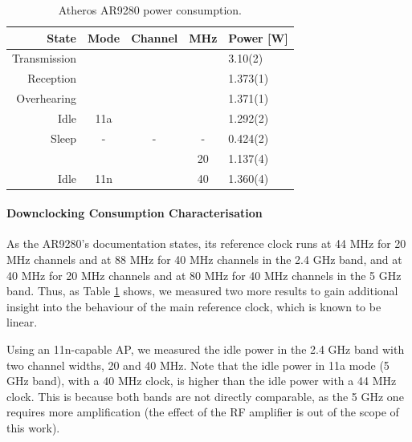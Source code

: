 \documentclass[twoside,nohyper]{tufte-book}
\theoremstyle{definition}
\theoremstyle{definition}
\theoremstyle{definition}
\theoremstyle{remark}
\begin{document}
\begin{table}

\begin{center}
\begin{tabular}{rcccl}
\toprule
State & Mode & Channel & MHz & Power [W]\\
\midrule
Transmission &  &  &  & 3.10(2)\\

Reception &  &  &  & 1.373(1)\\

Overhearing &  &  &  & 1.371(1)\\

Idle & \multirow{-4}{*}{\centering\arraybackslash 11a} & \multirow{-4}{*}{\centering\arraybackslash 44} & \multirow{-4}{*}{\centering\arraybackslash 20} & 1.292(2)\\
\cmidrule{1-5}
Sleep & - & - & - & 0.424(2)\\
\cmidrule{1-5}
 &  &  & 20 & 1.137(4)\\

\multirow{-2}{*}{\raggedleft\arraybackslash Idle} & \multirow{-2}{*}{\centering\arraybackslash 11n} & \multirow{-2}{*}{\centering\arraybackslash 11} & 40 & 1.360(4)\\
\bottomrule
\end{tabular}
\end{center}
\caption{\label{tab:powert}Atheros AR9280 power consumption.}
\end{table}

\hypertarget{downclocking-consumption-characterisation}{%
\paragraph{Downclocking Consumption
Characterisation}\label{downclocking-consumption-characterisation}}

As the AR9280's documentation states, its reference clock runs at 44 MHz
for 20 MHz channels and at 88 MHz for 40 MHz channels in the 2.4 GHz
band, and at 40 MHz for 20 MHz channels and at 80 MHz for 40 MHz
channels in the 5 GHz band. Thus, as Table \ref{tab:powert} shows, we
measured two more results to gain additional insight into the behaviour
of the main reference clock, which is known to be
linear\cite[0pt]{Zhang2012}.

Using an 11n-capable AP, we measured the idle power in the 2.4 GHz band
with two channel widths, 20 and 40 MHz. Note that the idle power in 11a
mode (5 GHz band), with a 40 MHz clock, is higher than the idle power
with a 44 MHz clock. This is because both bands are not directly
comparable, as the 5 GHz one requires more amplification (the effect of
the RF amplifier is out of the scope of this work).
\end{document}
